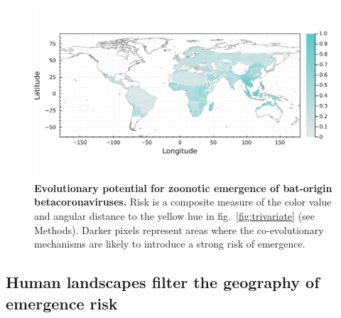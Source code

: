 \documentclass[10pt,oneside]{article}
\makeatletter
\def\maxwidth{\ifdim\Gin@nat@width>\linewidth\linewidth
\else\Gin@nat@width\fi}
\let\Oldincludegraphics\includegraphics
\renewcommand{\includegraphics}[1]{\Oldincludegraphics[width=\maxwidth]{#1}}
\makeatother
\begin{document}
\begin{figure}
\hypertarget{fig:risk}{%
\centering
\includegraphics{figures/risk_map.png}
\caption{\textbf{Evolutionary potential for zoonotic emergence of
bat-origin betacoronaviruses.} Risk is a composite measure of the color
value and angular distance to the yellow hue in
fig.~\ref{fig:trivariate} (see Methods). Darker pixels represent areas
where the co-evolutionary mechanisms are likely to introduce a strong
risk of emergence.}\label{fig:risk}
}
\end{figure}

\hypertarget{human-landscapes-filter-the-geography-of-emergence-risk}{%
\subsection{Human landscapes filter the geography of emergence
risk}\label{human-landscapes-filter-the-geography-of-emergence-risk}}
\end{document}
